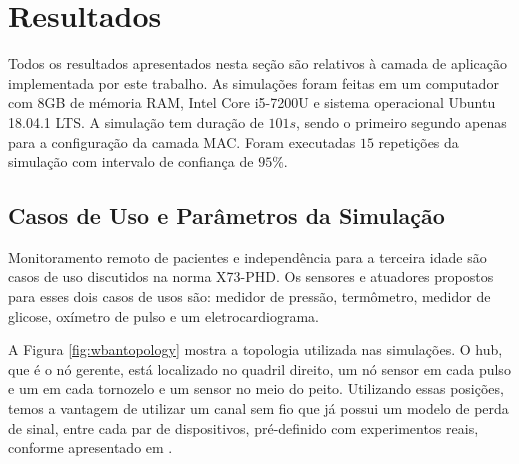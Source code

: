 \section{Resultados}\label{results}
Todos os resultados apresentados nesta seção são relativos à camada de aplicação implementada por este trabalho. As simulações foram feitas em um computador com 8GB de mémoria RAM, Intel Core i5-7200U e sistema operacional Ubuntu 18.04.1 LTS. A simulação tem duração de $101s$, sendo o primeiro segundo apenas para a configuração da camada MAC. Foram executadas $15$ repetições da simulação com intervalo de confiança de $95\%$. 

\subsection{Casos de Uso e Parâmetros da Simulação}

Monitoramento remoto de pacientes e independência para a terceira idade são casos de uso discutidos na norma X73-PHD. Os sensores e atuadores propostos para esses dois casos de usos são: medidor de pressão, termômetro, medidor de glicose, oxímetro de pulso e um eletrocardiograma.

A Figura \ref{fig:wbantopology} mostra a topologia utilizada nas simulações. O hub, que é o nó gerente, está localizado no quadril direito, um nó sensor em cada pulso e um em cada tornozelo e um sensor no meio do peito. Utilizando essas posições, temos a vantagem de utilizar um canal sem fio que já possui um modelo de perda de sinal, entre cada par de dispositivos, pré-definido com experimentos reais, conforme apresentado em \cite{b4}.

